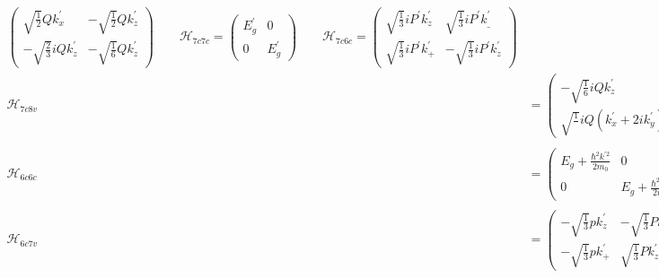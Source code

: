 \begin{align*}
\begin{pmatrix}
 \sqrt{\frac{1}{2}}Qk_x^{'}&-\sqrt{\frac{1}{2}}Qk_z^{'}  \\
-\sqrt{\frac{2}{3}}iQk_z^{'}  &-\sqrt{\frac{1}{6}}Qk_z^{'}
\end{pmatrix}\qquad
\mathcal{H}_{7c7c}=\begin{pmatrix}
 E_g^{'} &0\\
 0 &E_g^{'}
\end{pmatrix}\qquad
\mathcal{H}_{7c6c}=\begin{pmatrix}
 \sqrt{\frac{1}{3}}iP^{'}k_z^{'}  & \sqrt{\frac{1}{3}}iP^{'}k_\_^{'}  \\
 \sqrt{\frac{1}{3}}iP^{'}k_+^{'}  & -\sqrt{\frac{1}{3}}iP^{'}k_z^{'} 
\end{pmatrix}\\
\mathcal{H}_{7c8v}&=\begin{pmatrix}
-\sqrt{\frac{1}{6}} iQk_z^{'} &\sqrt{\frac{1}{2}}iQk_x^{'} &\sqrt{\frac{1}{2}}iQk_z^{'} &\sqrt{\frac{1}{}}iQ(k_x^{'}+2ik_y^{'})\\
\sqrt{\frac{1}{}}iQ(k_x^{'}+2ik_y^{'}) &\sqrt{\frac{1}{2}}iQk_z &\sqrt{\frac{1}{2}} iQk_x^{'} &-\sqrt{\frac{1}{6}}iQk_z^{'}
\end{pmatrix}\qquad
\mathcal{H}_{7c7v}=\begin{pmatrix}
-\frac{2}{3}i\overline{\Delta} &0\\
0 &-\frac{2}{3}i\overline{\Delta}
\end{pmatrix}\\
\mathcal{H}_{6c6c}&=\begin{pmatrix}
E_g +\frac{\hbar^2k^{'2}}{2m_0} & 0\\
0 &E_g +\frac{\hbar^2k^{'2}}{2m_0}
\end{pmatrix}\qquad
\mathcal{H}_{6c8v}=\begin{pmatrix}
-\sqrt{\frac{1}{2}}Pk_+^{'}  &\sqrt{\frac{2}{3}}Pk_z^{'}  &\sqrt{\frac{1}{6}}Pk_\_^{'}  &0 \\
0 &-\sqrt{\frac{1}{6}}Pk_+^{'}  &\sqrt{\frac{2}{3}}Pk_z^{'}  &\sqrt{\frac{1}{2}}Pk_\_^{'} 
\end{pmatrix}\\
\mathcal{H}_{6c7v}&=\begin{pmatrix}
-\sqrt{\frac{1}{3}}pk_z^{'}  &-\sqrt{\frac{1}{3}}Pk_\_^{'} \\
-\sqrt{\frac{1}{3}}pk_+^{'}  &\sqrt{\frac{1}{3}}Pk_z^{'} 
\end{pmatrix}\qquad
\mathcal{H}_{7v7v}=\begin{pmatrix}
-\frac{\hbar^2k^{'2}}{2m_0}\gamma_1^{'}-\Delta &0\\
0 &-\frac{\hbar^2k^{'2}}{2m_0}\gamma_1^{'}-\Delta
\end{pmatrix}
\end{align*}
